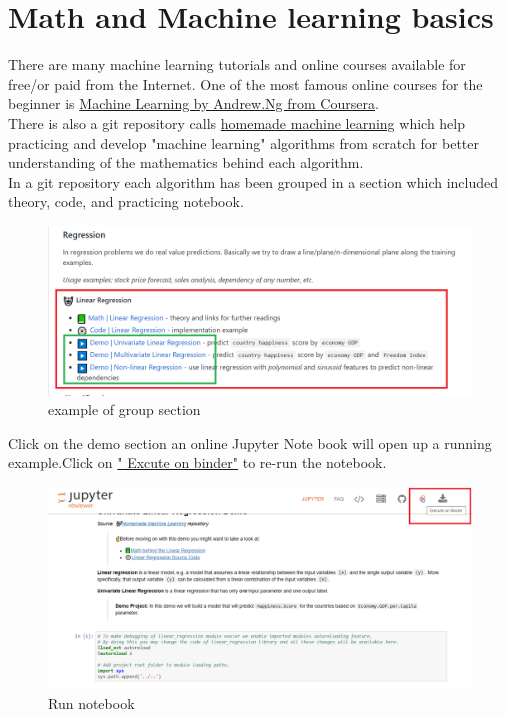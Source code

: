 \documentclass[a4paper,10pt]{article}
\begin{document}


\section{Math and Machine learning basics}
\label{sec:start}

\hspace{4ex} There are many machine learning tutorials and online courses available for free/or paid from the Internet. One of the most famous online courses for the beginner is \href{https://www.coursera.org/learn/machine-learning}{Machine Learning by Andrew.Ng from Coursera}.\\
There is also a git repository calls \href{https://github.com/trekhleb/homemade-machine-learning}{homemade machine learning} which help practicing and develop "machine learning" algorithms from scratch for better understanding of the mathematics behind each algorithm.\\  
In a git repository each algorithm has been grouped in a section which included theory, code, and practicing notebook. 

\begin{figure}[H]
\centering\includegraphics[width=1\columnwidth]{Pictures/HomeMade.png}
\caption[Short title]{example of group section}
\label{fig:ff7}\end{figure}

\vspace{5mm}
Click on the demo section an online Jupyter Note book will open up a running example.Click on \href{https://mybinder.org/v2/gh/trekhleb/homemade-machine-learning/master?filepath=notebooks/linear_regression/univariate_linear_regression_demo.ipynb}{" Excute on binder"} to re-run the notebook.  

\begin{figure}[H]
\centering\includegraphics[width=1\columnwidth]{Pictures/Re_run.png}
\caption[Short title]{Run notebook}
\label{fig:ff7}\end{figure}
\end{document}
